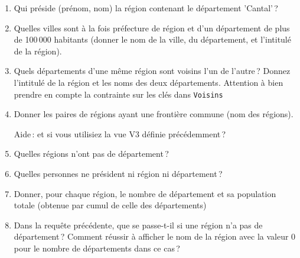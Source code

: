 \begin{enumerate}
  \item Qui préside (prénom, nom) la région contenant le département 'Cantal'\,?
  
  \item Quelles villes sont à la fois préfecture de région et d'un 
  département de plus de 100\,000 habitants
  (donner le nom de la ville, du département, et l'intitulé de la région). 
  
  \item Quels départements d'une même région sont voisins l'un de l'autre\,?
     Donnez l'intitulé de la région et les noms des deux départements.
     Attention à bien prendre en compte la contrainte sur les clés
     dans \texttt{Voisins}
     
   \item Donner les paires de régions ayant une frontière commune
   (nom des régions). 
   
   Aide\,: et si vous utilisiez la vue V3 définie précédemment\,?
   
   \item Quelles régions n'ont pas de département\,?
   
   \item Quelles personnes ne président ni région ni département\,?
   
   \item Donner, pour chaque région, le nombre de département et sa population totale (obtenue
   par cumul de celle des départements)
   
   \item Dans la requête précédente, que se passe-t-il si une
      région n'a pas de département\,? Comment réussir 
      à afficher le nom de la région avec la valeur 0 pour le nombre
      de départements dans ce cas\,?
\end{enumerate}


